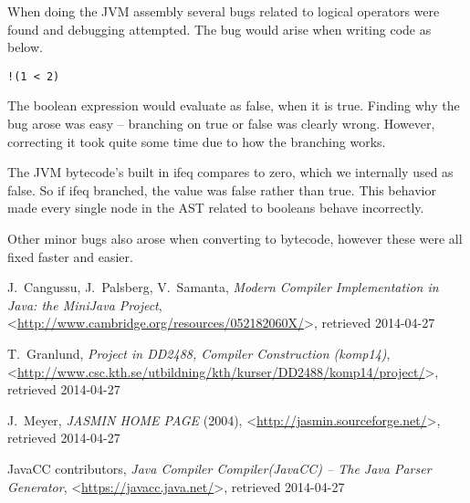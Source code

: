 \documentclass[a4paper]{article}
\begin{document}
When doing the JVM assembly several bugs related to logical operators were found and debugging attempted. The bug would arise when writing code as below.

\begin{lstlisting}
!(1 < 2)
\end{lstlisting}

The boolean expression would evaluate as false, when it is true. Finding why the bug arose was easy – branching on true or false was clearly wrong. However, correcting it took quite some time due to how the branching works.

The JVM bytecode's built in ifeq compares to zero, which we internally used as false. So if ifeq branched, the value was false rather than true. This behavior made every single node in the AST related to booleans behave incorrectly.

Other minor bugs also arose when converting to bytecode, however these were all fixed faster and easier.

\begin{thebibliography}{99}

    J.~Cangussu, J.~Palsberg, V.~Samanta,
    \emph{Modern Compiler Implementation in Java: the MiniJava Project},
    <\url{http://www.cambridge.org/resources/052182060X/}>, retrieved 2014-04-27

    T.~Granlund,
    \emph{Project in DD2488, Compiler Construction (komp14)},
    <\url{http://www.csc.kth.se/utbildning/kth/kurser/DD2488/komp14/project/}>, retrieved 2014-04-27

    J.~Meyer,
    \emph{JASMIN HOME PAGE} (2004),
    <\url{http://jasmin.sourceforge.net/}>, retrieved 2014-04-27

    JavaCC contributors,
    \emph{Java Compiler Compiler\texttrademark (JavaCC\texttrademark) -- The Java Parser Generator},
    <\url{https://javacc.java.net/}>, retrieved 2014-04-27

\end{thebibliography}
\end{document}
